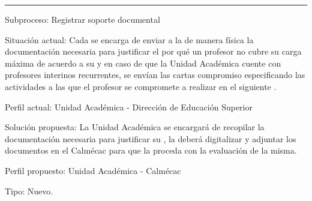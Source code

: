 
\hrule
\vspace{0.2cm}
\begin{Cdescription}
	\item[Subproceso:] Registrar soporte documental
	\item[Situación actual:] Cada  se encarga de enviar a la  de manera física la documentación necesaria para justificar el por qué un profesor no cubre su carga máxima de acuerdo a su  y en caso de que la Unidad Académica cuente con profesores interinos recurrentes, se envían las cartas compromiso especificando las actividades a las que el profesor se compromete a realizar en el siguiente .
	\item[Perfil actual:] Unidad Académica - Dirección de Educación Superior
	\item[Solución propuesta:] La Unidad Académica se encargará de recopilar la documentación necesaria para justificar su  , la deberá digitalizar y adjuntar los documentos en el Calmécac para que la  proceda con la evaluación de la misma.
	\item[Perfil propuesto:] Unidad Académica - Calmécac
	\item[Tipo:] Nuevo.
\end{Cdescription}

